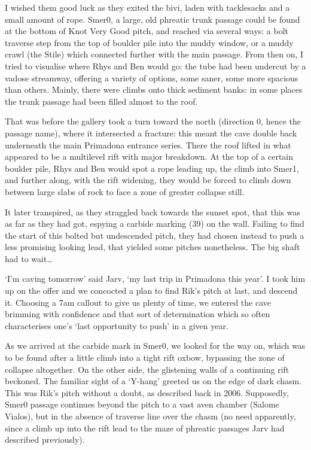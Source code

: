 I wished them good luck as they exited the bivi, laden with tacklesacks and a small amount of rope. Smer0, a large, old phreatic trunk passage could be found at the bottom of Knot Very Good pitch, and reached via several ways: a bolt traverse step from the top of boulder pile into the muddy window, or a muddy crawl (the Stile) which connected further with the main passage. From then on, I tried to visualise where Rhys and Ben would go: the tube had been undercut by a vadose streamway, offering a variety of options, some saner, some more spacious than others. Mainly, there were climbs onto thick sediment banks: in some places the trunk passage had been filled almost to the roof. 

That was before the gallery took a turn toward the north (direction 0, hence the passage name), where it intersected a fracture: this meant the cave double back underneath the main Primadona entrance series. There the roof lifted in what appeared to be a multilevel rift with major breakdown. At the top of a certain boulder pile, Rhys and Ben would spot a rope leading up, the climb into Smer1, and further along, with the rift widening, they would be forced to climb down between large slabs of rock to face a zone of greater collapse still. 

It later transpired, as they straggled back towards the sunset spot, that this was as far as they had got, espying a carbide marking (39) on the wall. Failing to find the start of this bolted but undescended pitch, they had chosen instead to push a less promising looking lead, that yielded some pitches nonetheless. The big shaft had to wait…

‘I’m caving tomorrow’ said Jarv, ‘my last trip in Primadona this year’. I took him up on the offer and we concocted a plan to find Rik’s pitch at last, and descend it. Choosing a 7am callout to give us plenty of time, we entered the cave brimming with confidence and that sort of determination which so often characterises one’s ‘last opportunity to push’ in a given year. 

As we arrived at the carbide mark in Smer0, we looked for the way on, which was to be found after a little climb into a tight rift oxbow, bypassing the zone of collapse altogether. On the other side, the glistening walls of a continuing rift beckoned. The familiar sight of a ‘Y-hang’ greeted us on the edge of dark chasm. This was Rik’s pitch without a doubt, as described back in 2006. Supposedly, Smer0 passage continues beyond the pitch to a vast aven chamber (Salome Vialos), but in the absence of traverse line over the chasm (no need apparently, since a climb up into the rift lead to the maze of phreatic passages Jarv had described previously).


